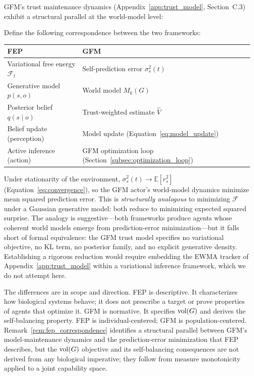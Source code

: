 GFM's trust maintenance dynamics (Appendix~\ref{app:trust_model}, Section~C.3)
exhibit a structural parallel at the world-model level:

\begin{remark}
\label{rem:fep_correspondence}
Define the following correspondence between the two frameworks:
\begin{center}
\begin{tabular}{@{}ll@{}}
\toprule
\textbf{FEP} & \textbf{GFM} \\
\midrule
Variational free energy $\mathcal{F}_t$ & Self-prediction error $\sigma_s^2(t)$ \\
Generative model $p(s, o)$ & World model $M_k(G)$ \\
Posterior belief $q(s \mid o)$ & Trust-weighted estimate $\hat{V}$ \\
Belief update (perception) & Model update (Equation~\eqref{eq:model_update}) \\
Active inference (action) & GFM optimization loop (Section~\ref{subsec:optimization_loop}) \\
\bottomrule
\end{tabular}
\end{center}
Under stationarity of the environment, $\sigma_s^2(t) \to \mathbb{E}[r_s^2]$
    (Equation~\eqref{eq:convergence}), so the GFM actor's world-model dynamics
    minimize mean squared prediction error. This is \emph{structurally
    analogous} to minimizing $\mathcal{F}$ under a Gaussian generative model:
    both reduce to minimizing expected squared surprise. The analogy is
    suggestive---both frameworks produce agents whose coherent world models
    emerge from prediction-error minimization---but it falls short of formal
    equivalence: the GFM trust model specifies no variational objective, no KL
    term, no posterior family, and no explicit generative density. Establishing
    a rigorous reduction would require embedding the EWMA tracker of
    Appendix~\ref{app:trust_model} within a variational inference framework,
    which we do not attempt here.
\end{remark}

The differences are in scope and direction. FEP is descriptive. It
characterizes how biological systems behave; it does not prescribe a target or
prove properties of agents that optimize it. GFM is normative. It specifies
$\operatorname{vol}(G)$ and derives the self-balancing property. FEP is individual-centered;
GFM is population-centered. Remark~\ref{rem:fep_correspondence} identifies a
structural parallel between GFM's model-maintenance dynamics and the
prediction-error minimization that FEP describes, but the $\operatorname{vol}(G)$ objective
and its self-balancing consequences are not derived from any biological
imperative; they follow from measure monotonicity applied to a joint
capability space.

